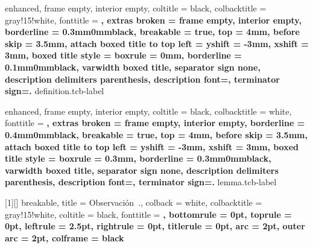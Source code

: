{
    enhanced,
    frame empty,
    interior empty,
    coltitle = black,
    colbacktitle = gray!15!white,
    fonttitle = \bfseries,
    extras broken = {frame empty, interior empty},
    borderline = {0.3mm}{0mm}{black},
    breakable = true,
    top = 4mm,
    before skip = 3.5mm,
    attach boxed title to top left = {yshift = -3mm, xshift = 3mm},
    boxed title style = {boxrule = 0mm, borderline = {0.1mm}{0mm}{black}},
    varwidth boxed title,
    separator sign none, description delimiters parenthesis,
    description font=\bfseries,
    terminator sign={.\hspace{1mm}}
}
{definition.tcb-label}

{
    enhanced,
    frame empty,
    interior empty,
    coltitle = black,
    colbacktitle = white,
    fonttitle = \bfseries,
    extras broken = {frame empty, interior empty},
    borderline = {0.4mm}{0mm}{black},
    breakable = true,
    top = 4mm,
    before skip = 3.5mm,
    attach boxed title to top left = {yshift = -3mm, xshift = 3mm},
    boxed title style = {boxrule = 0.3mm, borderline = {0.3mm}{0mm}{black}},
    varwidth boxed title,
    separator sign none, description delimiters parenthesis,
    description font=\bfseries,
    terminator sign={.\hspace{1mm}}
}
{lemma.tcb-label}

[1][]
{
    breakable,
    title = Observación~\thetcbcounter.,
    colback = white,
    colbacktitle = gray!15!white,
    coltitle = black,
    fonttitle = \bfseries,
    bottomrule = 0pt,
    toprule = 0pt,
    leftrule = 2.5pt,
    rightrule = 0pt,
    titlerule = 0pt,
    arc = 2pt,
    outer arc = 2pt,
    colframe = black
}


\newenvironment{section-theorem.tcb}[1][]
{
    \ifstrempty{#1}
    {
        \begin{tcb-theorem-style}{}{}
    }
    {
        \begin{tcb-theorem-style}{#1}{}
    }
    }{
    \end{tcb-theorem-style}
}

\newenvironment{section-problem.tcb}
{
    \begin{tcb-problem-style}{}{}
    }{
    \end{tcb-problem-style}
}

\newenvironment{section-example.tcb}[1][]
{
    \ifstrempty{#1}
    {
        \begin{tcb-example-style}{}{}
    }
    {
        \begin{tcb-example-style}{#1}{}
    }
    }{
    \end{tcb-example-style}
}

